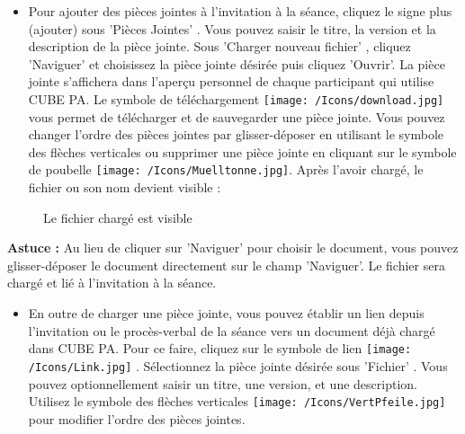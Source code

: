 \vspace{\baselineskip}

\begin{itemize}
\item 
Pour ajouter des pièces jointes à l'invitation à la séance, cliquez le signe plus (ajouter) sous 'Pièces Jointes' . Vous pouvez saisir le titre, la version et la description de la pièce jointe. Sous 'Charger nouveau fichier' , cliquez 'Naviguer' et choisissez la pièce jointe désirée puis cliquez 'Ouvrir'. La pièce jointe s'affichera dans l'aperçu personnel de chaque participant qui utilise CUBE PA. Le symbole de téléchargement \texttt{[image: /Icons/download.jpg]}  vous permet de télécharger et de sauvegarder une pièce jointe. Vous pouvez changer l'ordre des pièces jointes par glisser-déposer en utilisant le symbole des flèches verticales ou supprimer une pièce jointe en cliquant sur le symbole de poubelle \texttt{[image: /Icons/Muelltonne.jpg]}. Après l'avoir chargé, le fichier ou son nom devient visible :
\end{itemize}

\begin{figure}[H]
\caption{Le fichier chargé est visible}
\end{figure}

\textbf{Astuce :} Au lieu de cliquer sur 'Naviguer' pour choisir le document, vous pouvez glisser-déposer le document directement sur le champ 'Naviguer'. Le fichier sera chargé et lié à l'invitation à la séance.

\vspace{\baselineskip}

\begin{itemize}
\item
En outre de charger une pièce jointe, vous pouvez établir un lien depuis l'invitation ou le procès-verbal de la séance vers un document déjà chargé dans CUBE PA. Pour ce faire, cliquez sur le symbole de lien \texttt{[image: /Icons/Link.jpg]} . Sélectionnez la pièce jointe désirée sous 'Fichier' . Vous pouvez optionnellement saisir un titre, une version, et une description. Utilisez le symbole des flèches verticales \texttt{[image: /Icons/VertPfeile.jpg]} pour modifier l'ordre des pièces jointes.
\end{itemize}

